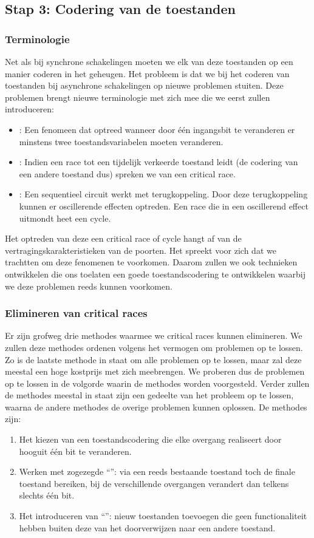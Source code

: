 \subsection{Stap 3: Codering van de toestanden}
\subsubsection{Terminologie}
\label{term:race}
Net als bij synchrone schakelingen moeten we elk van deze toestanden op een manier coderen in het geheugen. Het probleem is dat we bij het coderen van toestanden bij asynchrone schakelingen op nieuwe problemen stuiten. Deze problemen brengt nieuwe terminologie met zich mee die we eerst zullen introduceren:
\begin{itemize}
 \item {}: Een fenomeen dat optreed wanneer door \'e\'en ingangsbit te veranderen er minstens twee toestandsvariabelen moeten veranderen.
 \item {}: Indien een race tot een tijdelijk verkeerde toestand leidt (de codering van een andere toestand dus) spreken we van een critical race.
 \item {}: Een sequentieel circuit werkt met terugkoppeling. Door deze terugkoppeling kunnen er oscillerende effecten optreden. Een race die in een oscillerend effect uitmondt heet een cycle.
\end{itemize}
Het optreden van deze een critical race of cycle hangt af van de vertragingskarakteristieken van de poorten. Het spreekt voor zich dat we trachtten om deze fenomenen te voorkomen. Daarom zullen we ook technieken ontwikkelen die ons toelaten een goede toestandscodering te ontwikkelen waarbij we deze problemen reeds kunnen voorkomen.
\subsubsection{Elimineren van critical races}
Er zijn grofweg drie methodes waarmee we critical races kunnen elimineren. We zullen deze methodes ordenen volgens het vermogen om problemen op te lossen. Zo is de laatste methode in staat om alle problemen op te lossen, maar zal deze meestal een hoge kostprijs met zich meebrengen. We proberen dus de problemen op te lossen in de volgorde waarin de methodes worden voorgesteld. Verder zullen de methodes meestal in staat zijn een gedeelte van het probleem op te lossen, waarna de andere methodes de overige problemen kunnen oplossen. De methodes zijn:
\begin{enumerate}
 \item Het kiezen van een toestandscodering die elke overgang realiseert door hooguit \'e\'en bit te veranderen.
 \item Werken met zogezegde ``'': via een reeds bestaande toestand toch de finale toestand bereiken, bij de verschillende overgangen verandert dan telkens slechts \'e\'en bit.
 \item Het introduceren van ``'': nieuw toestanden toevoegen die geen functionaliteit hebben buiten deze van het doorverwijzen naar een andere toestand.
\end{enumerate}
